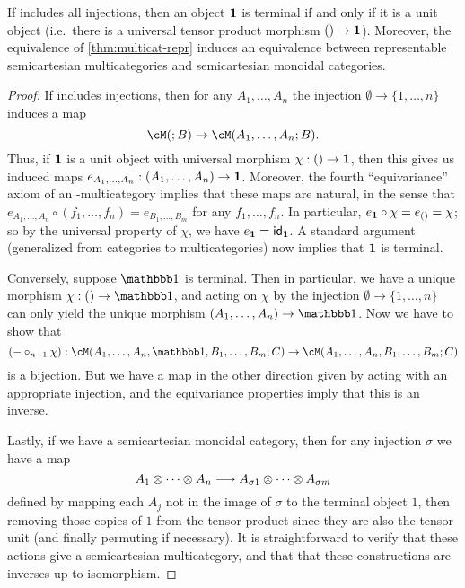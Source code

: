 \begin{thm}\label{thm:semicart-multicat-repr}
  If \fS includes all injections, then an object $\mathbf{1}$ is terminal if and only if it is a unit object (i.e.\ there is a universal tensor product morphism $()\to \mathbf{1}$).
  Moreover, the equivalence of \cref{thm:multicat-repr} induces an equivalence between representable semicartesian multicategories and semicartesian monoidal categories.
\end{thm}
\begin{proof}
  If \fS includes injections, then for any $A_1,\dots,A_n$ the injection $\emptyset \to \{1,\dots,n\}$ induces a map
  \[ \cM(;B) \to \cM(A_1,\dots,A_n;B). \]
  Thus, if $\mathbf{1}$ is a unit object with universal morphism $\chi:()\to \mathbf{1}$, then this gives us induced maps $e_{A_1,\dots,A_n}:(A_1,\dots,A_n) \to \mathbf{1}$.
  Moreover, the fourth ``equivariance'' axiom of an \fS-multicategory implies that these maps are natural, in the sense that
  $e_{A_1,\dots,A_n} \circ (f_1,\dots,f_n) = e_{B_1,\dots,B_m}$ for any $f_1,\dots,f_n$.
  In particular, $e_{\mathbf{1}} \circ \chi = e_{()} = \chi$; so by the universal property of $\chi$, we have $e_{\mathbf{1}} = \mathsf{id}_{\mathbf{1}}$.
  A standard argument (generalized from categories to multicategories) now implies that $\mathbf{1}$ is terminal.

  Conversely, suppose $\unit$ is terminal.
  Then in particular, we have a unique morphism $\chi : ()\to \unit$, and acting on $\chi$ by the injection $\emptyset \to \{1,\dots,n\}$ can only yield the unique morphism $(A_1,\dots,A_n)\to \unit$.
  Now we have to show that
  \[ (-\circ_{n+1} \chi) : \cM(A_1,\dots,A_n,\unit,B_1,\dots,B_m; C) \to \cM(A_1,\dots,A_n,B_1,\dots,B_m; C) \]
  is a bijection.
  But we have a map in the other direction given by acting with an appropriate injection, and the equivariance properties imply that this is an inverse.

  Lastly, if we have a semicartesian monoidal category, then for any injection $\sigma$ we have a map
  \[ A_1\otimes \cdots\otimes A_n \overset{}{\longrightarrow} A_{\sigma 1} \otimes\dots\otimes A_{\sigma m} \]
  defined by mapping each $A_j$ not in the image of $\sigma$ to the terminal object $1$, then removing those copies of $1$ from the tensor product since they are also the tensor unit (and finally permuting if necessary).
  It is straightforward to verify that these actions give a semicartesian multicategory, and that that these constructions are inverses up to isomorphism.
\end{proof}

